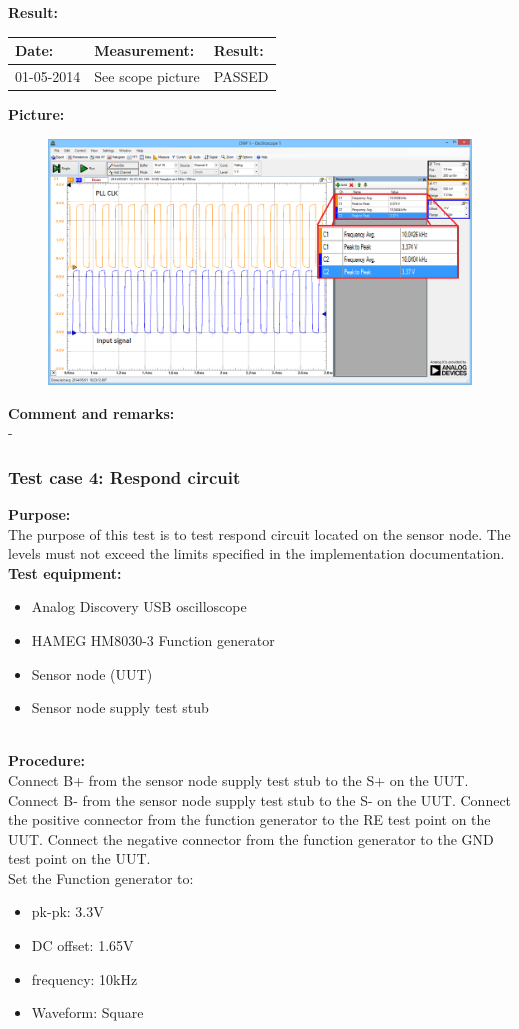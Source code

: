 \textbf{Result:}
\begin{table}[H]
	\centering
	\begin{tabular}{|p{2cm}|p{3cm}|p{2cm}|}\hline
		\textbf{Date:} & \textbf{Measurement:} & \textbf{Result:} \\ \hline
	 	01-05-2014 & See scope picture & PASSED \\ \hline
	\end{tabular}
\end{table}
\textbf{Picture:}
\begin{figure}[H]
\centering
\includegraphics[width=.9\textwidth]{billeder/SN_Case_3_osc_picture}
\end{figure}
\textbf{Comment and remarks:}\\
-\\

\subsubsection{Test case 4: Respond circuit}
\textbf{Purpose:}\\
The purpose of this test is to test respond circuit located on the sensor node. The levels must not exceed the limits specified in the implementation documentation.\\

\textbf{Test equipment:}
\begin{itemize}
	\item Analog Discovery USB oscilloscope
	\item HAMEG HM8030-3 Function generator
	\item Sensor node (UUT)
	\item Sensor node supply test stub
\end{itemize}
\ \\
\textbf{Procedure:}\\
Connect B+ from the sensor node supply test stub to the S+ on the UUT. Connect B- from the sensor node supply test stub to the S- on the UUT.
Connect the positive connector from the function generator to the RE test point on the UUT. Connect the negative connector from the function generator to the GND test point on the UUT.\\ Set the Function generator to:
\begin{itemize}
	\item pk-pk: 3.3V
	\item DC offset: 1.65V
	\item frequency: 10kHz
	\item Waveform: Square
\end{itemize}

